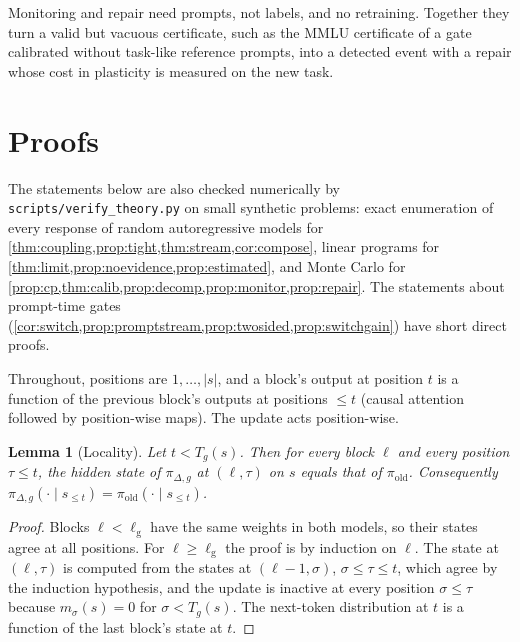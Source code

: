 \documentclass{article}
\theoremstyle{plain}
\newtheorem{lemma}[theorem]{Lemma}
\theoremstyle{definition}
\theoremstyle{remark}
\newcommand{\pold}{\pi_{\mathrm{old}}}
\renewcommand{\lg}{\ell_{\mathrm{g}}}
\begin{document}
Monitoring and repair need prompts, not labels, and no retraining. Together they turn a valid but vacuous
certificate, such as the MMLU certificate of a gate calibrated without task-like reference prompts, into a detected event with a repair whose cost in plasticity is measured on the new task.

\section{Proofs}
\label{app:proofs}

The statements below are also checked numerically by \texttt{scripts/verify\_theory.py} on small synthetic problems:
exact enumeration of every response of random autoregressive models for \cref{thm:coupling,prop:tight,thm:stream,cor:compose}, linear programs for \cref{thm:limit,prop:noevidence,prop:estimated}, and Monte Carlo for
\cref{prop:cp,thm:calib,prop:decomp,prop:monitor,prop:repair}. The statements about prompt-time gates
(\cref{cor:switch,prop:promptstream,prop:twosided,prop:switchgain}) have short direct proofs.

Throughout, positions are $1,\dots,|s|$, and a block's output at position $t$ is a function of the previous block's
outputs at positions $\le t$ (causal attention followed by position-wise maps). The update acts position-wise.

\begin{lemma}[Locality]
\label{lem:locality}
Let $t<T_g(s)$. Then for every block $\ell$ and every position $\tau\le t$, the hidden state of $\pi_{\Delta,g}$ at
$(\ell,\tau)$ on $s$ equals that of $\pold$. Consequently $\pi_{\Delta,g}(\cdot\mid s_{\le t})=\pold(\cdot\mid
s_{\le t})$.
\end{lemma}

\begin{proof}
Blocks $\ell<\lg$ have the same weights in both models, so their states agree at all positions. For $\ell\ge\lg$
the proof is by induction on $\ell$. The state at $(\ell,\tau)$ is computed from the states at $(\ell-1,\sigma)$,
$\sigma\le\tau\le t$, which agree by the induction hypothesis, and the update is inactive at every position $\sigma\le\tau$ because
$m_\sigma(s)=0$ for $\sigma<T_g(s)$. The next-token distribution at $t$ is a function of the last block's state at $t$.
\end{proof}
\end{document}
